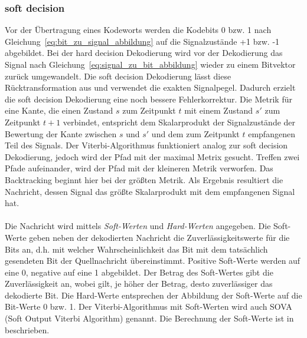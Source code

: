 %				
%				

\subsubsection{soft decision}
\label{kapitel:grundlagen_soft_decision}
Vor der Übertragung eines Kodeworts werden die Kodebits 0 bzw. 1 nach Gleichung~\eqref{eq:bit_zu_signal_abbildung} auf die Signalzustände +1 bzw. -1 abgebildet. Bei der hard decision Dekodierung wird vor der Dekodierung das Signal nach Gleichung~\eqref{eq:signal_zu_bit_abbildung} wieder zu einem Bitvektor zurück umgewandelt. Die soft decision Dekodierung lässt diese Rücktransformation aus und verwendet die exakten Signalpegel. Dadurch erzielt die soft decision Dekodierung eine noch bessere Fehlerkorrektur. Die Metrik für eine Kante, die einen Zustand $s$ zum Zeitpunkt $t$ mit einem Zustand $s'$ zum Zeitpunkt $t+1$ verbindet, entspricht dem Skalarprodukt der Signalzustände der Bewertung der Kante zwischen $s$ und $s'$ und dem zum Zeitpunkt $t$ empfangenen Teil des Signals. Der Viterbi-Algorithmus funktioniert analog zur soft decision Dekodierung, jedoch wird der Pfad mit der maximal Metrix gesucht. Treffen zwei Pfade aufeinander, wird der Pfad mit der kleineren Metrik verworfen. Das Backtracking beginnt hier bei der größten Metrik. Als Ergebnis resultiert die Nachricht, dessen Signal das größte Skalarprodukt mit dem empfangenen Signal hat.
\\
\\
Die Nachricht wird mittels \emph{Soft-Werten} und \emph{Hard-Werten} angegeben. Die Soft-Werte geben neben der dekodierten Nachricht die Zuverlässigkeitswerte für die Bits an, d.h. mit welcher Wahrscheinlichkeit das Bit mit dem tatsächlich gesendeten Bit der Quellnachricht übereinstimmt. Positive Soft-Werte werden auf eine 0, negative auf eine 1 abgebildet. Der Betrag des Soft-Wertes gibt die Zuverlässigkeit an, wobei gilt, je höher der Betrag, desto zuverlässiger das dekodierte Bit. Die Hard-Werte entsprechen der Abbildung der Soft-Werte auf die Bit-Werte 0 bzw. 1. Der Viterbi-Algorithmus mit Soft-Werten wird auch SOVA (Soft Output Viterbi Algorithm) genannt. Die Berechnung der Soft-Werte ist in \cite[S. 228 ff.]{schonfeld2012informations} beschrieben.

